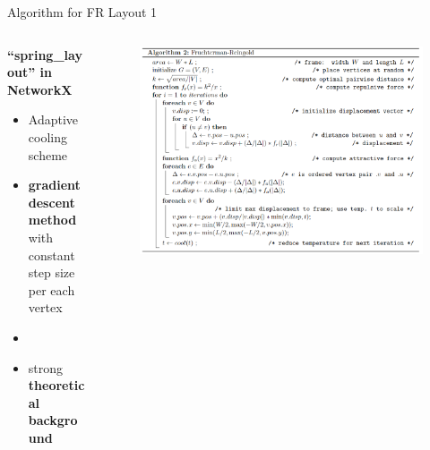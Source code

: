 \documentclass[13pt,aspectratio=169,table,dvipdfmx]{beamer}
\newif\ifShowHidden
\begin{document}
\ifShowHidden
    \begin{frame}{Algorithm for FR Layout 1}
        \begin{columns}
            \begin{column}{0.4\columnwidth}
                \textbf{``spring\_layout'' in NetworkX}
                \begin{itemize}
                    \item Adaptive cooling scheme
                    \item \textbf{gradient descent method}\\with constant step size\\per each vertex
                    \item \cite{tunkelang1999numerical}
                    \item strong \textbf{theoretical background}
                \end{itemize}
            \end{column}
            \begin{column}{0.6\columnwidth}
                \begin{figure}[htbp]
                    \centering
                    \includegraphics[width=\columnwidth]{imgs/FR_code.png}
                    \caption{\cite{kobourov2012spring}}
                \end{figure}
            \end{column}
        \end{columns}
    \end{frame}
\end{document}
